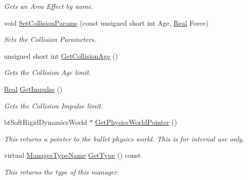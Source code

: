 \begin{DoxyCompactItemize}
\begin{DoxyCompactList}\small\item\em Gets an Area Effect by name. \item\end{DoxyCompactList}\item 
void \hyperlink{classphys_1_1PhysicsManager_a98ee9704eec230ff759850ffa8394489}{SetCollisionParams} (const unsigned short int Age, \hyperlink{namespacephys_af7eb897198d265b8e868f45240230d5f}{Real} Force)
\begin{DoxyCompactList}\small\item\em Sets the Collision Parameters. \item\end{DoxyCompactList}\item 
unsigned short int \hyperlink{classphys_1_1PhysicsManager_a4232e8cd52e70b623ef30c40be6cdb4a}{GetCollisionAge} ()
\begin{DoxyCompactList}\small\item\em Gets the Collision Age limit. \item\end{DoxyCompactList}\item 
\hyperlink{namespacephys_af7eb897198d265b8e868f45240230d5f}{Real} \hyperlink{classphys_1_1PhysicsManager_ad11ee3904e1725f95ce9bd58f4ee3925}{GetImpulse} ()
\begin{DoxyCompactList}\small\item\em Gets the Collision Impulse limit. \item\end{DoxyCompactList}\item 
btSoftRigidDynamicsWorld $\ast$ \hyperlink{classphys_1_1PhysicsManager_a4b4f8a23259a94a50c81649f39256d7f}{GetPhysicsWorldPointer} ()
\begin{DoxyCompactList}\small\item\em This returns a pointer to the bullet physics world. This is for internal use only. \item\end{DoxyCompactList}\item 
virtual \hyperlink{classphys_1_1ManagerBase_aaa6ccddf23892eaccb898529414f80a5}{ManagerTypeName} \hyperlink{classphys_1_1PhysicsManager_a4d151cd24052ef3cccde6b66b8745be6}{GetType} () const 
\begin{DoxyCompactList}\small\item\em This returns the type of this manager. \item\end{DoxyCompactList}\end{DoxyCompactItemize}


